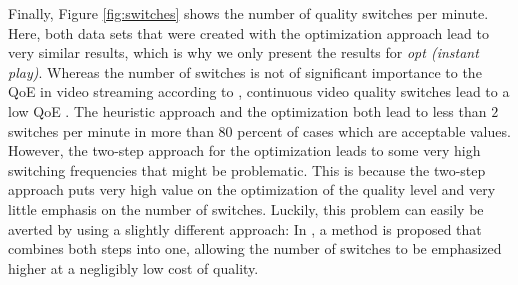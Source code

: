 Finally, Figure \ref{fig:switches} shows the number of quality switches per minute. Here, both data sets that were created with the optimization approach lead to very similar results, which is why we only present the results for \textit{opt (instant play)}. Whereas the number of switches is not of significant importance to the QoE in video streaming according to \cite{seufert2015survey}, continuous video quality switches lead to a low QoE \cite{liu2013user}. The heuristic approach and the optimization both lead to less than $2$ switches per minute in more than $80$ percent of cases which are acceptable values. However, the two-step approach for the optimization leads to some very high switching frequencies that might be problematic. This is because the two-step approach puts very high value on the optimization of the quality level and very little emphasis on the number of switches. Luckily, this problem can easily be averted by using a slightly different approach: In \cite{liotou2016enriching}, a method is proposed that combines both steps into one, allowing the number of switches to be emphasized higher at a negligibly low cost of quality.


